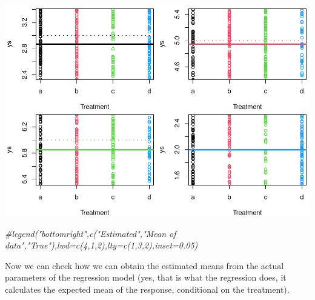 \documentclass[
]{book}
\newenvironment{Shaded}{\begin{snugshade}}{\end{snugshade}}
\newcommand{\CommentTok}[1]{\textcolor[rgb]{0.56,0.35,0.01}{\textit{#1}}}
\newcommand{\DataTypeTok}[1]{\textcolor[rgb]{0.13,0.29,0.53}{#1}}
\newcommand{\DecValTok}[1]{\textcolor[rgb]{0.00,0.00,0.81}{#1}}
\newcommand{\KeywordTok}[1]{\textcolor[rgb]{0.13,0.29,0.53}{\textbf{#1}}}
\newcommand{\NormalTok}[1]{#1}
\newcommand{\OperatorTok}[1]{\textcolor[rgb]{0.81,0.36,0.00}{\textbf{#1}}}
\newcommand{\StringTok}[1]{\textcolor[rgb]{0.31,0.60,0.02}{#1}}
\begin{document}
\begin{Shaded}
\end{Shaded}

\includegraphics{ECOMODbook_files/figure-latex/a8.33-1.pdf}

\begin{Shaded}
\begin{Highlighting}[]
\CommentTok{#legend("bottomright",c("Estimated","Mean of data","True"),lwd=c(4,1,2),lty=c(1,3,2),inset=0.05)}
\end{Highlighting}
\end{Shaded}

Now we can check how we can obtain the estimated means from the actual parameters of the regression model (yes, that is what the regression does, it calculates the expected mean of the response, conditional on the treatment).
\end{document}
